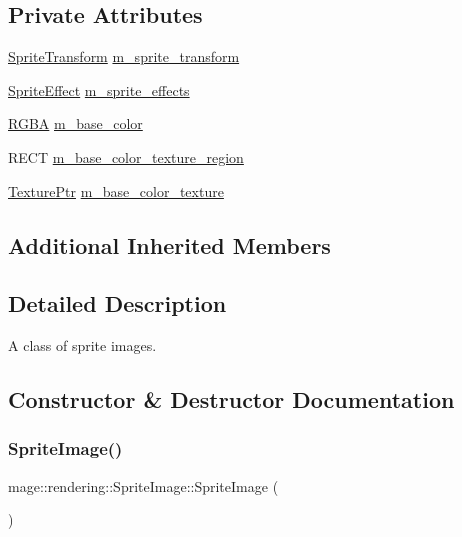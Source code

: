 \subsection*{Private Attributes}
\begin{DoxyCompactItemize}
\item 
\hyperlink{classmage_1_1_sprite_transform}{Sprite\+Transform} \hyperlink{classmage_1_1rendering_1_1_sprite_image_a7985369471809a6efcdeb8a265510b7a}{m\+\_\+sprite\+\_\+transform}
\item 
\hyperlink{namespacemage_1_1rendering_a4dbc3536c87b906f1d41d863ec458e78}{Sprite\+Effect} \hyperlink{classmage_1_1rendering_1_1_sprite_image_a25891d2cfd1edd3dc86c0bc82700cad2}{m\+\_\+sprite\+\_\+effects}
\item 
\hyperlink{structmage_1_1_r_g_b_a}{R\+G\+BA} \hyperlink{classmage_1_1rendering_1_1_sprite_image_a9f17f78cd6731bc604daa2b4f2593435}{m\+\_\+base\+\_\+color}
\item 
R\+E\+CT \hyperlink{classmage_1_1rendering_1_1_sprite_image_a18de0a4473e2bfee074cd152d1ba2c3e}{m\+\_\+base\+\_\+color\+\_\+texture\+\_\+region}
\item 
\hyperlink{namespacemage_1_1rendering_a6f3ae54f825328465b0cdde0f0de4a36}{Texture\+Ptr} \hyperlink{classmage_1_1rendering_1_1_sprite_image_a1b68c232550bfc55aa794fcffbeab489}{m\+\_\+base\+\_\+color\+\_\+texture}
\end{DoxyCompactItemize}
\subsection*{Additional Inherited Members}


\subsection{Detailed Description}
A class of sprite images. 

\subsection{Constructor \& Destructor Documentation}
\hypertarget{classmage_1_1rendering_1_1_sprite_image_af49f06e0de889dbfd2db264d9e07fc20}{}\label{classmage_1_1rendering_1_1_sprite_image_af49f06e0de889dbfd2db264d9e07fc20} 
\subsubsection{\texorpdfstring{Sprite\+Image()}{SpriteImage()}\hspace{0.1cm}{\footnotesize\ttfamily [1/3]}}
{\footnotesize\ttfamily mage\+::rendering\+::\+Sprite\+Image\+::\+Sprite\+Image (\begin{DoxyParamCaption}{ }\end{DoxyParamCaption})\hspace{0.3cm}{\ttfamily [noexcept]}}

